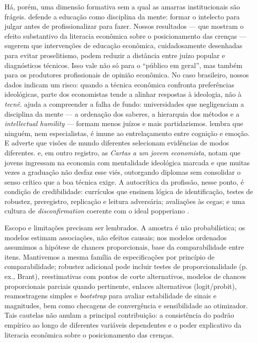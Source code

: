 Há, porém, uma dimensão formativa sem a qual as amarras institucionais são frágeis.  defende a educação como disciplina da mente: formar o intelecto para julgar antes de profissionalizar para fazer. Nossos resultados — que mostram o efeito substantivo da literacia econômica sobre o posicionamento das crenças — sugerem que intervenções de educação econômica, cuidadosamente desenhadas para evitar proselitismo, podem reduzir a distância entre juízo popular e diagnósticos técnicos. Isso vale não só para o “público em geral”, mas também para os produtores profissionais de opinião econômica. No caso brasileiro, nossos dados indicam um risco: quando a técnica econômica confronta preferências ideológicas, parte dos economistas tende a alinhar respostas à ideologia, não à \textit{tecnê}.  ajuda a compreender a falha de fundo: universidades que negligenciam a disciplina da mente — a ordenação dos saberes, a hierarquia dos métodos e a \textit{intellectual humility} — formam menos juízos e mais partidarismos.  lembra que ninguém, nem especialistas, é imune ao entrelaçamento entre cognição e emoção. E  adverte que visões de mundo diferentes selecionam evidências de modos diferentes.  e, em outro registro, as \textit{Cartas a um jovem economista}, notam que jovens ingressam na economia com mentalidade ideológica marcada e que muitas vezes a graduação não desfaz esse viés, outorgando diplomas sem consolidar o senso crítico que a boa técnica exige. A autocrítica da profissão, nesse ponto, é condição de credibilidade: currículos que ensinem lógica de identificação, testes de robustez, preregistro, replicação e leitura adversária; avaliações às cegas; e uma cultura de \textit{disconfirmation} coerente com o ideal popperiano \cite{popperlogic}.

Escopo e limitações precisam ser lembrados. A amostra é não probabilística; os modelos estimam associações, não efeitos causais; nos modelos ordenados assumimos a hipótese de chances proporcionais, base da comparabilidade entre itens. Mantivemos a mesma família de especificações por princípio de comparabilidade; robustez adicional pode incluir testes de proporcionalidade (p.\,ex., Brant), reestimativas com pontos de corte alternativos, modelos de chances proporcionais parciais quando pertinente, enlaces alternativos (logit/probit), reamostragens simples e \textit{bootstrap} para avaliar estabilidade de sinais e magnitudes, bem como checagens de convergência e sensibilidade ao otimizador. Tais cautelas não anulam a principal contribuição: a consistência do padrão empírico ao longo de diferentes variáveis dependentes e o poder explicativo da literacia econômica sobre o posicionamento das crenças.

